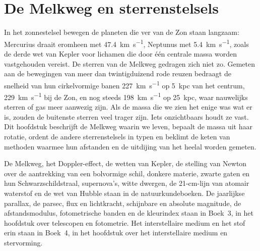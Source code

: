\chapter{De Melkweg en sterrenstelsels}\label{ch:b3:milky-way-galaxies}

In het zonnestelsel bewegen de planeten die ver van de Zon staan langzaam: Mercurius
draait eromheen met \qty{47.4}{km.s^{-1}}, Neptunus met \qty{5.4}{km.s^{-1}}, zoals
de derde wet van Kepler voor lichamen die door één centrale massa worden vastgehouden vereist. De sterren
van de Melkweg gedragen zich niet zo. Gemeten aan de bewegingen van meer
dan twintigduizend rode reuzen bedraagt de snelheid van hun cirkelvormige banen
\qty{227}{km.s^{-1}} op \qty{5}{kpc} van het centrum, \qty{229}{km.s^{-1}}
bij de Zon, en nog steeds \qty{198}{km.s^{-1}} op \qty{25}{kpc}, waar nauwelijks
sterren of gas meer aanwezig zijn. Als de massa die we zien het enige was wat er is, zouden de buitenste
sterren veel trager zijn. Iets onzichtbaars houdt ze vast. Dit hoofdstuk
beschrijft de Melkweg waarin we leven, bepaalt de massa uit haar rotatie, ordent de
andere sterrenstelsels in typen en beklimt de keten van methoden waarmee
hun afstanden en de uitdijing van het heelal worden gemeten.

\begin{recall}
De Melkweg, het Doppler-effect, de wetten van Kepler, de stelling van Newton over de
aantrekking van een bolvormige schil, donkere materie, zwarte gaten en hun
Schwarzschildstraal, supernova's, witte dwergen, de 21-cm-lijn van atomair
waterstof en de wet van Hubble staan in de natuurkundeboeken. De jaarlijkse parallax,
de parsec, flux en lichtkracht, schijnbare en absolute magnitude, de
afstandsmodulus, fotometrische banden en de kleurindex staan in
Boek~3, in het hoofdstuk over telescopen en fotometrie. Het
interstellaire medium en het stof erin staan in Boek~4, in het hoofdstuk
over het interstellaire medium en stervorming.
\end{recall}

